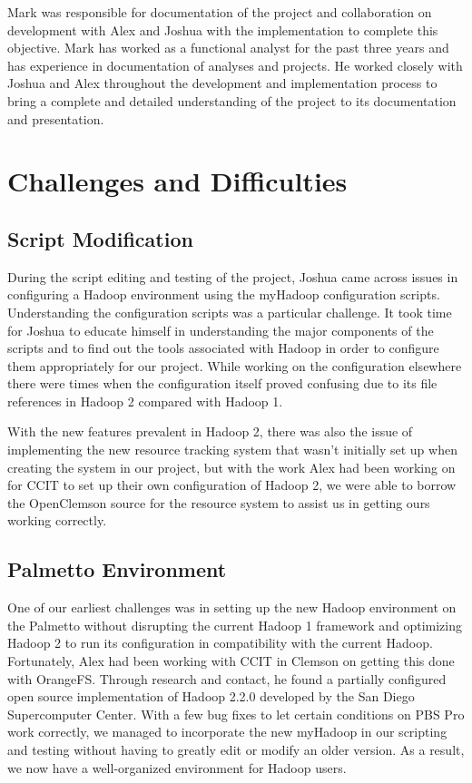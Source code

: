 \documentclass[conference]{IEEEtran}
\begin{document}
			Mark was responsible for documentation of the project and collaboration on development with Alex and Joshua with the implementation to complete this objective. Mark has worked as a functional analyst for the past three years and has experience in documentation of analyses and projects. He worked closely with Joshua and Alex throughout the development and implementation process to bring a complete and detailed understanding of the project to its documentation and presentation.

		\section{Challenges and Difficulties}
			\subsection{Script Modification}
				During the script editing and testing of the project, Joshua came across issues in configuring a Hadoop environment using the myHadoop configuration scripts. Understanding the configuration scripts was a particular challenge. It took time for Joshua to educate himself in understanding the major components of the scripts and to find out the tools associated with Hadoop in order to configure them appropriately for our project. While working on the configuration elsewhere there were times when the configuration itself proved confusing due to its file references in Hadoop 2 compared with Hadoop 1. 

                With the new features prevalent in Hadoop 2, there was also the issue of implementing the new resource tracking system that wasn’t initially set up when creating the system in our project, but with the work Alex had been working on for CCIT to set up their own configuration of Hadoop 2, we were able to borrow the OpenClemson source\cite{openclemson} for the resource system to assist us in getting ours working correctly.
			\subsection{Palmetto Environment}
				One of our earliest challenges was in setting up the new Hadoop environment on the Palmetto without disrupting the current Hadoop 1 framework and optimizing Hadoop 2 to run its configuration in compatibility with the current Hadoop. Fortunately, Alex had been working with CCIT in Clemson on getting this done with OrangeFS. Through research and contact, he found a partially configured open source implementation of Hadoop 2.2.0 developed by the San Diego Supercomputer Center. With a few bug fixes to let certain conditions on PBS Pro work correctly, we managed to incorporate the new myHadoop in our scripting and testing without having to greatly edit or modify an older version. As a result, we now have a well-organized environment for Hadoop users.
\end{document}
